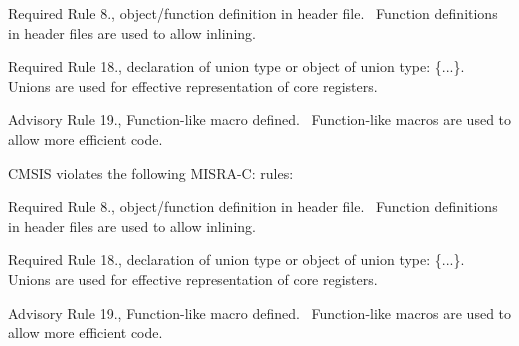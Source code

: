 \begin{DoxyItemize}
\item Required Rule 8., object/\+function definition in header file.~\newline
 Function definitions in header files are used to allow \textquotesingle{}inlining\textquotesingle{}.\end{DoxyItemize}
\begin{DoxyItemize}
\item Required Rule 18., declaration of union type or object of union type:\+ \textquotesingle{}\{...\}\textquotesingle{}.~\newline
 Unions are used for effective representation of core registers.\end{DoxyItemize}
\begin{DoxyItemize}
\item Advisory Rule 19., Function-\/like macro defined.~\newline
 Function-\/like macros are used to allow more efficient code.\end{DoxyItemize}


CMSIS violates the following MISRA-\/C: rules:\+

\begin{DoxyItemize}
\item Required Rule 8., object/\+function definition in header file.~\newline
 Function definitions in header files are used to allow \textquotesingle{}inlining\textquotesingle{}.\end{DoxyItemize}
\begin{DoxyItemize}
\item Required Rule 18., declaration of union type or object of union type:\+ \textquotesingle{}\{...\}\textquotesingle{}.~\newline
 Unions are used for effective representation of core registers.\end{DoxyItemize}
\begin{DoxyItemize}
\item Advisory Rule 19., Function-\/like macro defined.~\newline
 Function-\/like macros are used to allow more efficient code. \end{DoxyItemize}
